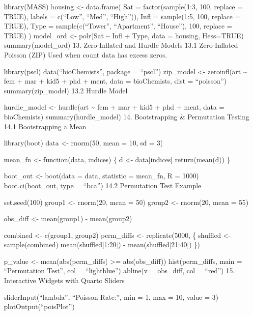 \documentclass[
  letterpaper,
  DIV=11,
  numbers=noendperiod]{scrreprt}
\begin{document}
library(MASS) housing \textless- data.frame( Sat = factor(sample(1:3,
100, replace = TRUE), labels = c(``Low'', ``Med'', ``High'')), Infl =
sample(1:5, 100, replace = TRUE), Type = sample(c(``Tower'',
``Apartment'', ``House''), 100, replace = TRUE) ) model\_ord \textless-
polr(Sat \textasciitilde{} Infl + Type, data = housing, Hess=TRUE)
summary(model\_ord) 13. Zero-Inflated and Hurdle Models 13.1
Zero-Inflated Poisson (ZIP) Used when count data has excess zeros.

library(pscl) data(``bioChemists'', package = ``pscl'') zip\_model
\textless- zeroinfl(art \textasciitilde{} fem + mar + kid5 + phd + ment,
data = bioChemists, dist = ``poisson'') summary(zip\_model) 13.2 Hurdle
Model

hurdle\_model \textless- hurdle(art \textasciitilde{} fem + mar + kid5 +
phd + ment, data = bioChemists) summary(hurdle\_model) 14. Bootstrapping
\& Permutation Testing 14.1 Bootstrapping a Mean

library(boot) data \textless- rnorm(50, mean = 10, sd = 3)

mean\_fn \textless- function(data, indices) \{ d \textless-
data{[}indices{]} return(mean(d)) \}

boot\_out \textless- boot(data = data, statistic = mean\_fn, R = 1000)
boot.ci(boot\_out, type = ``bca'') 14.2 Permutation Test Example

set.seed(100) group1 \textless- rnorm(20, mean = 50) group2 \textless-
rnorm(20, mean = 55)

obs\_diff \textless- mean(group1) - mean(group2)

combined \textless- c(group1, group2) perm\_diffs \textless-
replicate(5000, \{ shuffled \textless- sample(combined)
mean(shuffled{[}1:20{]}) - mean(shuffled{[}21:40{]}) \})

p\_value \textless- mean(abs(perm\_diffs) \textgreater= abs(obs\_diff))
hist(perm\_diffs, main = ``Permutation Test'', col = ``lightblue'')
abline(v = obs\_diff, col = ``red'') 15. Interactive Widgets with Quarto
Sliders

sliderInput(``lambda'', ``Poisson Rate:'', min = 1, max = 10, value = 3)
plotOutput(``poisPlot'')
\end{document}
